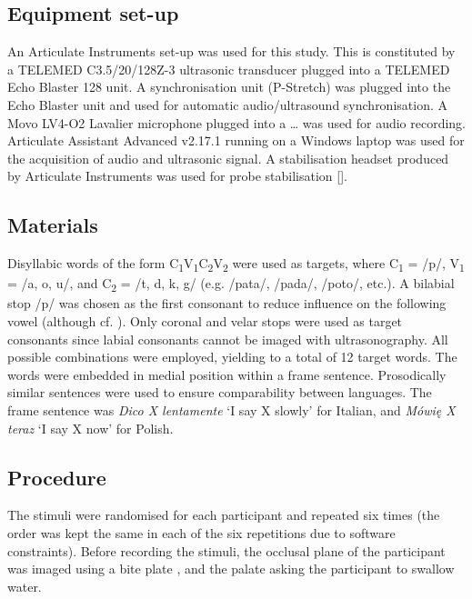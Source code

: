 \documentclass[]{elsarticle}
\begin{document}
\subsection{Equipment set-up}\label{equipment-set-up}

An Articulate Instruments set-up was used for this study. This is
constituted by a TELEMED C3.5/20/128Z-3 ultrasonic transducer plugged
into a TELEMED Echo Blaster 128 unit. A synchronisation unit (P-Stretch)
was plugged into the Echo Blaster unit and used for automatic
audio/ultrasound synchronisation. A Movo LV4-O2 Lavalier microphone
plugged into a \ldots{} was used for audio recording. Articulate
Assistant Advanced v2.17.1 running on a Windows laptop was used for the
acquisition of audio and ultrasonic signal. A stabilisation headset
produced by Articulate Instruments was used for probe stabilisation
{[}{]}.

\subsection{Materials}\label{materials}

Disyllabic words of the form
C\textsubscript{1}V\textsubscript{1}C\textsubscript{2}V\textsubscript{2}
were used as targets, where C\textsubscript{1} = /p/, V\textsubscript{1}
= /a, o, u/, and C\textsubscript{2} = /t, d, k, g/ (e.g. /pata/, /pada/,
/poto/, etc.). A bilabial stop /p/ was chosen as the first consonant to
reduce influence on the following vowel (although cf.
\citet{vazquez-alvarez2007}). Only coronal and velar stops were used as
target consonants since labial consonants cannot be imaged with
ultrasonography. All possible combinations were employed, yielding to a
total of 12 target words. The words were embedded in medial position
within a frame sentence. Prosodically similar sentences were used to
ensure comparability between languages. The frame sentence was
\emph{Dico X lentamente} `I say X slowly' for Italian, and \emph{Mówię X
teraz} `I say X now' for Polish.

\subsection{Procedure}\label{procedure}

The stimuli were randomised for each participant and repeated six times
(the order was kept the same in each of the six repetitions due to
software constraints). Before recording the stimuli, the occlusal plane
of the participant was imaged using a bite plate \citep{scobbie2011},
and the palate asking the participant to swallow water.
\end{document}
